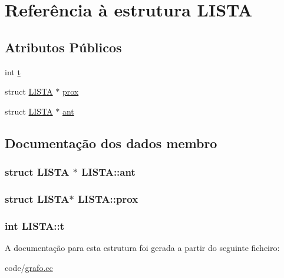 \hypertarget{structLISTA}{\section{Referência à estrutura L\-I\-S\-T\-A}
\label{structLISTA}
}
\subsection*{Atributos Públicos}
\begin{DoxyCompactItemize}
\item 
int \hyperlink{structLISTA_a81b29c44560db14d9d5ef75858c91a0b}{t}
\item 
struct \hyperlink{structLISTA}{L\-I\-S\-T\-A} $\ast$ \hyperlink{structLISTA_a818a9fbd5f34b29597c140c052309ea6}{prox}
\item 
struct \hyperlink{structLISTA}{L\-I\-S\-T\-A} $\ast$ \hyperlink{structLISTA_acbab5a56fa16181657e3036ffa9fca11}{ant}
\end{DoxyCompactItemize}


\subsection{Documentação dos dados membro}
\hypertarget{structLISTA_acbab5a56fa16181657e3036ffa9fca11}{
\subsubsection[{ant}]{\setlength{\rightskip}{0pt plus 5cm}struct {\bf L\-I\-S\-T\-A} $\ast$ L\-I\-S\-T\-A\-::ant}}\label{structLISTA_acbab5a56fa16181657e3036ffa9fca11}
\hypertarget{structLISTA_a818a9fbd5f34b29597c140c052309ea6}{
\subsubsection[{prox}]{\setlength{\rightskip}{0pt plus 5cm}struct {\bf L\-I\-S\-T\-A}$\ast$ L\-I\-S\-T\-A\-::prox}}\label{structLISTA_a818a9fbd5f34b29597c140c052309ea6}
\hypertarget{structLISTA_a81b29c44560db14d9d5ef75858c91a0b}{
\subsubsection[{t}]{\setlength{\rightskip}{0pt plus 5cm}int L\-I\-S\-T\-A\-::t}}\label{structLISTA_a81b29c44560db14d9d5ef75858c91a0b}


A documentação para esta estrutura foi gerada a partir do seguinte ficheiro\-:\begin{DoxyCompactItemize}
\item 
code/\hyperlink{grafo_8cc}{grafo.\-cc}\end{DoxyCompactItemize}
